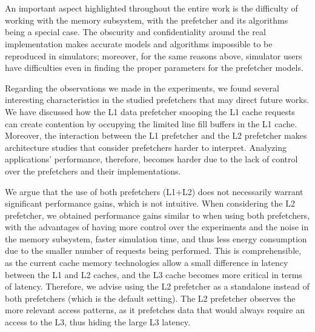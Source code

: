 \documentclass[AMA,final,STIX1COL]{WileyNJD-v2}
\newcommand\new[1]{{\color{red}{#1}}}
\begin{document}
\section{\new{Discussion and Guidelines}}\label{sec:insights}
{\color{red}
An important aspect highlighted throughout the entire work is the difficulty of working with the memory subsystem, with the prefetcher and its algorithms being a special case.
The obscurity and confidentiality around the real implementation makes accurate models and algorithms impossible to be reproduced in simulators; moreover, for the same reasons above, simulator users have difficulties even in finding the proper parameters for the prefetcher models.


Regarding the observations we made in the experiments, we found several interesting characteristics in the studied prefetchers that may direct future works.
We have discussed how the L1 data prefetcher snooping the L1 cache requests can create contention by occupying the limited line fill buffers in the L1 cache.
Moreover, the interaction between the L1 prefetcher and the L2 prefetcher makes architecture studies that consider prefetchers harder to interpret.
Analyzing applications' performance, therefore, becomes harder due to the lack of control over the prefetchers and their implementations.

We argue that the use of both prefetchers (L1+L2) does not necessarily warrant significant performance gains, which is not intuitive.
When considering the L2 prefetcher, we obtained performance gains similar to when using both prefetchers, with the advantages of having more control over the experiments and the noise in the memory subsystem, faster simulation time, and thus less energy consumption due to the smaller number of \new{prefetch} requests being performed. 
This is comprehensible, as the current cache memory technologies allow a small difference in latency between the L1 and L2 caches, and \new{avoiding accesses to} the L3 cache becomes more critical in terms of latency.
\new{The access latency to the off-chip L3 cache memory is considerably higher than the access latency of the L2 cache (on average 7x, due to the mesh topology necessary to fully utilize the cache, as it is distributed in L3 off-core banks).}
Therefore, we advise using the L2 prefetcher as a standalone instead of both prefetchers (which is the default setting).
The L2 prefetcher observes the more relevant access patterns, as it prefetches data that would always require an access to the L3, thus hiding the large L3 latency.


}
\end{document}
